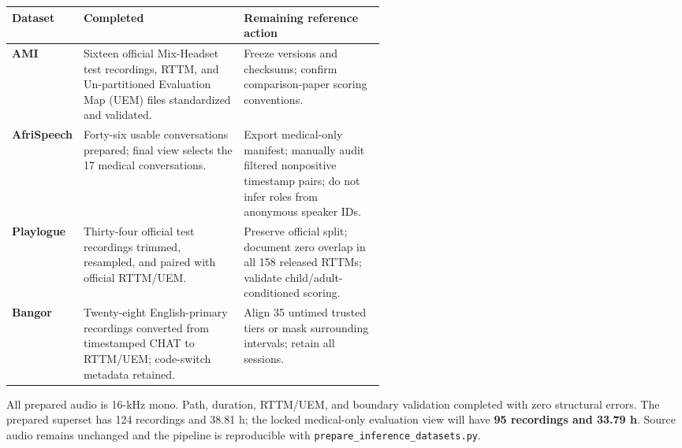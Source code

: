 \documentclass[9pt]{extarticle}
\newcommand{\model}[1]{\texttt{#1}}
\begin{document}
{\fontsize{7.25}{8.25}\selectfont
\begin{tabularx}{\linewidth}{@{}>{\bfseries}p{0.12\linewidth}p{0.43\linewidth}Y@{}}
\toprule
Dataset & Completed & Remaining reference action \\
\midrule
AMI & Sixteen official Mix-Headset test recordings, RTTM, and Un-partitioned
Evaluation Map (UEM) files standardized and validated. & Freeze versions and
checksums; confirm comparison-paper scoring conventions. \\
AfriSpeech & Forty-six usable conversations prepared; final view selects the 17
medical conversations. & Export medical-only manifest; manually audit filtered
nonpositive timestamp pairs; do not infer roles from anonymous speaker IDs. \\
Playlogue & Thirty-four official test recordings trimmed, resampled, and paired
with official RTTM/UEM. & Preserve official split; document zero overlap in all
158 released RTTMs; validate child/adult-conditioned scoring. \\
Bangor & Twenty-eight English-primary recordings converted from timestamped
CHAT to RTTM/UEM; code-switch metadata retained. & Align 35 untimed trusted
tiers or mask surrounding intervals; retain all sessions. \\
\bottomrule
\end{tabularx}}

All prepared audio is 16-kHz mono. Path, duration, RTTM/UEM, and boundary
validation completed with zero structural errors. The prepared superset has
124 recordings and 38.81 h; the locked medical-only evaluation view will have
\textbf{95 recordings and 33.79 h}. Source audio remains unchanged and the
pipeline is reproducible with \model{prepare\_inference\_datasets.py}.
\end{document}
